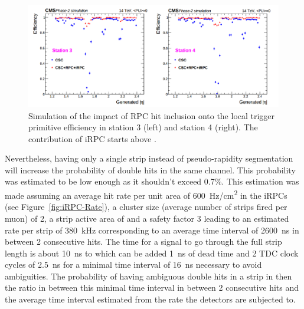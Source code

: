 	\begin{figure}[H]
		\centering
		\includegraphics[width=\linewidth]{fig/chapt3/Trigger-efficiency-endcap.png}
		\caption{\label{fig:Endcap-trigger-eff} Simulation of the impact of RPC hit inclusion onto the local trigger primitive efficiency in station 3 (left) and station 4 (right). The contribution of iRPC starts above .}
	\end{figure}
	
	Nevertheless, having only a single strip instead of pseudo-rapidity segmentation will increase the probability of double hits in the same channel. This probability was estimated to be low enough as it shouldn't exceed 0.7\%. This estimation was made assuming an average hit rate per unit area of \SI{600}{Hz/cm^2} in the iRPCs (see Figure~\ref{fig:iRPC-Rate}), a cluster size (average number of strips fired per muon) of 2, a strip active area of  and a safety factor 3 leading to an estimated rate per strip of \SI{380}{kHz} corresponding to an average time interval of \SI{2600}{ns} in between 2 consecutive hits. The time for a signal to go through the full strip length is about \SI{10}{ns} to which can be added \SI{1}{ns} of dead time and 2 TDC clock cycles of \SI{2.5}{ns} for a minimal time interval of \SI{16}{ns} necessary to avoid ambiguities. The probability of having ambiguous double hits in a strip in then the ratio in between this minimal time interval in between 2 consecutive hits and the average time interval estimated from the rate the detectors are subjected to.
	
